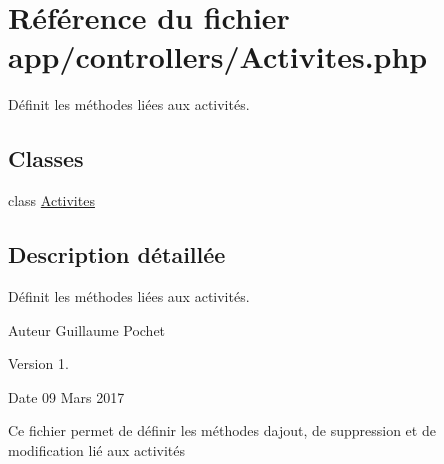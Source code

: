 \hypertarget{_activites_8php}{}\section{Référence du fichier app/controllers/\+Activites.php}
\label{_activites_8php}


Définit les méthodes liées aux activités.  


\subsection*{Classes}
\begin{DoxyCompactItemize}
\item 
class \hyperlink{class_activites}{Activites}
\end{DoxyCompactItemize}


\subsection{Description détaillée}
Définit les méthodes liées aux activités. 

\begin{DoxyAuthor}{Auteur}
Guillaume Pochet 
\end{DoxyAuthor}
\begin{DoxyVersion}{Version}
1. 
\end{DoxyVersion}
\begin{DoxyDate}{Date}
09 Mars 2017
\end{DoxyDate}
Ce fichier permet de définir les méthodes d\textquotesingle{}ajout, de suppression et de modification lié aux activités 